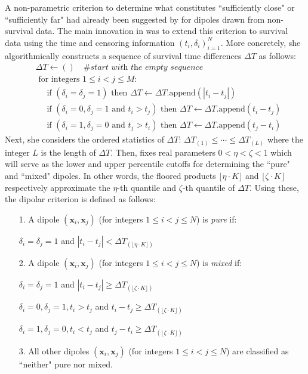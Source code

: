 \documentclass[12pt]{amsart}
\theoremstyle{definition}
\theoremstyle{plain}
\theoremstyle{remark}
\begin{document}
A non-parametric criterion to determine what constitutes ``sufficiently close" or ``sufficiently far" had already been suggested by \cite{bobrowskikretowski} for dipoles drawn from non-survival data. The main innovation in \cite{kretowska} was to extend this criterion to survival data using the time and censoring information $(t_i, \delta_i)_{i = 1}^N$. More concretely, she algorithmically constructs a sequence of survival time differences $\Delta T$ as follows:
\begin{align*}
&\Delta T \leftarrow () \quad \textit{\# start with the empty sequence} \\
&\text{ for integers } 1 \leq i < j \leq M: \\
&\quad \text{ if } (\delta_i = \delta_j = 1) \text{ then } \Delta T \leftarrow \Delta T.\text{append}(|t_i - t_j|) \\
&\quad \text{ if } (\delta_i = 0, \delta_j = 1 \text{ and } t_i > t_j) \text{ then } \Delta T \leftarrow \Delta T.\text{append}(t_i - t_j) \\
&\quad \text{ if } (\delta_i = 1, \delta_j = 0 \text{ and } t_j > t_i) \text{ then } \Delta T \leftarrow \Delta T.\text{append}(t_j - t_i)
\end{align*} Next, she considers the ordered statistics of $\Delta T$: $\Delta T_{(1)} \leq \cdots \leq \Delta T_{(L)}$ where the integer $L$ is the length of $\Delta T$. Then, \cite{kretowska} fixes real parameters $0 < \eta < \zeta < 1$ which will serve as the lower and upper percentile cutoffs for determining the ``pure" and ``mixed" dipoles. In other words, the floored products $\lfloor \eta \cdot K \rfloor$ and $\lfloor \zeta \cdot K \rfloor$ respectively approximate the $\eta$-th quantile and $\zeta$-th quantile of $\Delta T$. Using these, the dipolar criterion is defined as follows:
\begin{itemize}
	\item[1.] A dipole $(\mathbf{x}_i, \mathbf{x}_j)$ (for integers $1 \leq i < j \leq N$) is \emph{pure} if:
	
	$\delta_i = \delta_j = 1$ and $|t_i - t_j| < \Delta T_{(\lfloor \eta \cdot K \rfloor)}$
	
	\item[2.] A dipole $(\mathbf{x}_i, \mathbf{x}_j)$ (for integers $1 \leq i < j \leq N$) is \emph{mixed} if:
	
	$\delta_i = \delta_j = 1$ and $|t_i - t_j| \geq \Delta T_{(\lfloor \zeta \cdot K \rfloor)}$
	
	$\delta_i = 0, \delta_j = 1, t_i > t_j$ and $t_i - t_j \geq \Delta T_{(\lfloor \zeta \cdot K \rfloor)}$
	
	$\delta_i = 1, \delta_j = 0, t_i < t_j$ and $t_j - t_i \geq \Delta T_{(\lfloor \zeta \cdot K \rfloor)}$
	
	\item[3.] All other dipoles $(\mathbf{x}_i, \mathbf{x}_j)$ (for integers $1 \leq i < j \leq N$) are classified as ``neither" pure nor mixed.
\end{itemize}
\end{document}
